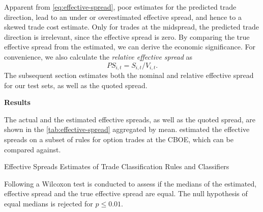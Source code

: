 Apparent from \cref{eq:effective-spread}, poor estimates for the predicted trade direction, lead to an under or overestimated effective spread, and hence to a skewed trade cost estimate. Only for trades at the midspread, the predicted trade direction is irrelevant, since the effective spread is zero. By comparing the true effective spread from the estimated, we can derive the economic significance. For convenience, we also calculate the \emph{relative effective spread} as
\begin{equation}
    {PS}_{i,t} = S_{i,t} / V_{i,t}.
\end{equation}
The subsequent section estimates both the nominal and relative effective spread for our test sets, as well as the quoted spread.

\textbf{Results}

The actual and the estimated effective spreads, as well as the quoted spread, are shown in the \cref{tab:effective-spread} aggregated by mean. \textcite[][896--897]{savickasInferringDirectionOption2003} estimated the effective spreads on a subset of rules for option trades at the \gls{CBOE}, which can be compared against.

\begin{table}[ht]
    \centering
    
    \caption{Effective Spreads Estimates of Trade Classification Rules and Classifiers}
    \label{tab:effective-spread}
\end{table}


Following \textcite[][12]{theissenTestAccuracyLee2000} a Wilcoxon test is conducted to assess if the medians of the estimated, effective spread and the true effective spread are equal. The null hypothesis of equal medians is rejected for $p \leq 0.01$.


